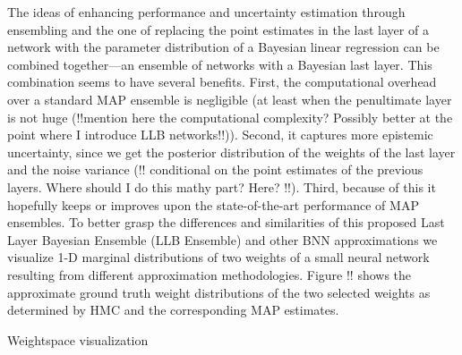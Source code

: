 \documentclass[../thesis.tex]{subfiles}
\begin{document}
The ideas of enhancing performance and uncertainty estimation through ensembling and the one of replacing the point estimates in the last layer of a network with the parameter distribution of a Bayesian linear regression can be combined together---an ensemble of networks with a Bayesian last layer. This combination seems to have several benefits. First, the computational overhead over a standard MAP ensemble is negligible (at least when the penultimate layer is not huge (!!mention here the computational complexity? Possibly better at the point where I introduce LLB networks!!)). Second, it captures more epistemic uncertainty, since we get the posterior distribution of the weights of the last layer and the noise variance (!! conditional on the point estimates of the previous layers. Where should I do this mathy part? Here? !!). Third, because of this it hopefully keeps or improves upon the state-of-the-art performance of MAP ensembles. 
To better grasp the differences and similarities of this proposed Last Layer Bayesian Ensemble (LLB Ensemble) and other BNN approximations we visualize 1-D marginal distributions of two weights of a small neural network resulting from different approximation methodologies. Figure !! shows the approximate ground truth weight distributions of the two selected weights as determined by HMC and the corresponding MAP estimates. 





Weightspace visualization
\end{document}
